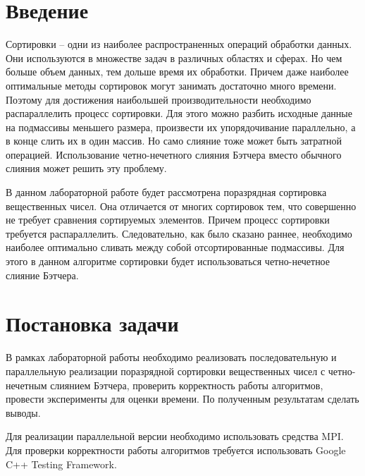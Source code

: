 \documentclass{report}
\begin{document}
\setcounter{page}{2}

\tableofcontents
\newpage

\section*{Введение}
Сортировки – одни из наиболее распространенных операций обработки данных. Они используются в множестве задач в различных областях и сферах. Но чем больше объем данных, тем дольше время их обработки. Причем даже наиболее оптимальные методы сортировок могут занимать достаточно много времени. Поэтому для достижения наибольшей производительности необходимо распараллелить процесс сортировки. Для этого можно разбить исходные данные на подмассивы меньшего размера, произвести их упорядочивание параллельно, а в конце слить их в один массив. Но само слияние тоже может быть затратной операцией. Использование четно-нечетного слияния Бэтчера вместо обычного слияния может решить эту проблему.
\par В данном лабораторной работе будет рассмотрена поразрядная сортировка вещественных чисел. Она отличается от многих сортировок тем, что совершенно не требует сравнения сортируемых элементов. Причем процесс сортировки требуется распараллелить. Следовательно, как было сказано раннее, необходимо наиболее оптимально сливать между собой отсортированные подмассивы. Для этого в данном алгоритме сортировки будет использоваться четно-нечетное слияние Бэтчера.
\newpage

\section*{Постановка задачи}
В рамках лабораторной работы необходимо реализовать последовательную и параллельную реализации поразрядной сортировки вещественных чисел с четно-нечетным слиянием Бэтчера, проверить корректность работы алгоритмов, провести эксперименты для оценки времени. По полученным результатам сделать выводы.
\par Для реализации параллельной версии необходимо использовать средства MPI. Для проверки корректности работы алгоритмов требуется использовать Google C++ Testing Framework.
\newpage

\end{document}
